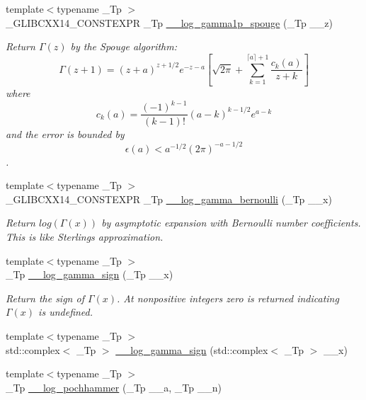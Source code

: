 \begin{DoxyCompactItemize}
{\footnotesize template$<$typename \+\_\+\+Tp $>$ }\\\+\_\+\+G\+L\+I\+B\+C\+X\+X14\+\_\+\+C\+O\+N\+S\+T\+E\+X\+PR \+\_\+\+Tp \hyperlink{namespacestd_1_1____detail_aca3fe0938c60534a835aeddc82555a75}{\+\_\+\+\_\+log\+\_\+gamma1p\+\_\+spouge} (\+\_\+\+Tp \+\_\+\+\_\+z)
\begin{DoxyCompactList}\small\item\em Return $\Gamma(z)$ by the Spouge algorithm\+: \[ \Gamma(z+1) = (z+a)^{z+1/2}e^{-z-a}\left[ \sqrt{2\pi} + \sum_{k=1}^{\lceil a \rceil + 1}\frac{c_k(a)}{z+k}\right] \] where \[ c_k(a) = \frac{(-1)^{k-1}}{(k-1)!}(a-k)^{k-1/2}e^{a-k} \] and the error is bounded by \[ \epsilon(a) < a^{-1/2}(2\pi)^{-a-1/2} \]. \end{DoxyCompactList}\item 
{\footnotesize template$<$typename \+\_\+\+Tp $>$ }\\\+\_\+\+G\+L\+I\+B\+C\+X\+X14\+\_\+\+C\+O\+N\+S\+T\+E\+X\+PR \+\_\+\+Tp \hyperlink{namespacestd_1_1____detail_ac13e31ebcd3c99d6a7cad9010e039315}{\+\_\+\+\_\+log\+\_\+gamma\+\_\+bernoulli} (\+\_\+\+Tp \+\_\+\+\_\+x)
\begin{DoxyCompactList}\small\item\em Return $log(\Gamma(x))$ by asymptotic expansion with Bernoulli number coefficients. This is like Sterling\textquotesingle{}s approximation. \end{DoxyCompactList}\item 
{\footnotesize template$<$typename \+\_\+\+Tp $>$ }\\\+\_\+\+Tp \hyperlink{namespacestd_1_1____detail_ac091f187fbe5efdbc912ec9ca38ba25f}{\+\_\+\+\_\+log\+\_\+gamma\+\_\+sign} (\+\_\+\+Tp \+\_\+\+\_\+x)
\begin{DoxyCompactList}\small\item\em Return the sign of $ \Gamma(x) $. At nonpositive integers zero is returned indicating $ \Gamma(x) $ is undefined. \end{DoxyCompactList}\item 
{\footnotesize template$<$typename \+\_\+\+Tp $>$ }\\std\+::complex$<$ \+\_\+\+Tp $>$ \hyperlink{namespacestd_1_1____detail_a775873eb710ac3f2d1dd774aba216795}{\+\_\+\+\_\+log\+\_\+gamma\+\_\+sign} (std\+::complex$<$ \+\_\+\+Tp $>$ \+\_\+\+\_\+x)
\item 
{\footnotesize template$<$typename \+\_\+\+Tp $>$ }\\\+\_\+\+Tp \hyperlink{namespacestd_1_1____detail_afc646f25bed26aee2265d225ed29bce6}{\+\_\+\+\_\+log\+\_\+pochhammer} (\+\_\+\+Tp \+\_\+\+\_\+a, \+\_\+\+Tp \+\_\+\+\_\+n)

\end{DoxyCompactItemize}
